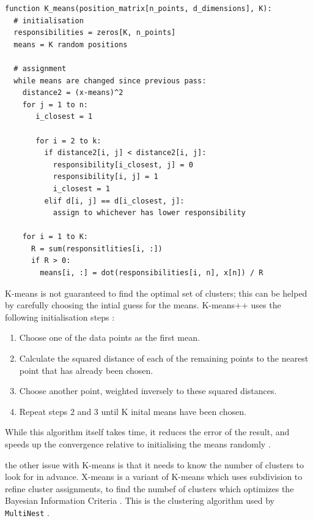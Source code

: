 \documentclass{article}
\begin{document}
\begin{verbatim}
function K_means(position_matrix[n_points, d_dimensions], K):
  # initialisation
  responsibilities = zeros[K, n_points]
  means = K random positions
  
  # assignment
  while means are changed since previous pass:
    distance2 = (x-means)^2
    for j = 1 to n:
       i_closest = 1
       
       for i = 2 to k:
         if distance2[i, j] < distance2[i, j]:
           responsibility[i_closest, j] = 0
           responsibility[i, j] = 1
           i_closest = 1
         elif d[i, j] == d[i_closest, j]:
           assign to whichever has lower responsibility
           
    for i = 1 to K:
      R = sum(responsitlities[i, :])
      if R > 0:
        means[i, :] = dot(responsibilities[i, n], x[n]) / R
\end{verbatim}
 
K-means is not guaranteed to find the optimal set of clusters; this can be helped by carefully choosing the intial guess for the means. K-means++ uses the following initialisation steps \cite{kmeans++}:
\begin{enumerate}
  \item Choose one of the data points as the first mean.
  \item Calculate the squared distance of each of the remaining points to the nearest point that has already been chosen.
  \item Choose another point, weighted inversely to these squared distances.
  \item Repeat steps 2 and 3 until K inital means have been chosen.
\end{enumerate}
While this algorithm itself takes time, it reduces the error of the result, and speeds up the convergence relative to initialising the means randomly \cite{kmeans++}.

the other issue with K-means is that it needs to know the number of clusters to look for in advance. X-means is a variant of K-means which uses subdivision to refine cluster assignments, to find the numbef of clusters which optimizes the Bayesian Information Criteria \cite{bic}. This is the clustering algorithm used by \texttt{MultiNest} \cite{Feroz_2008}.
\end{document}
